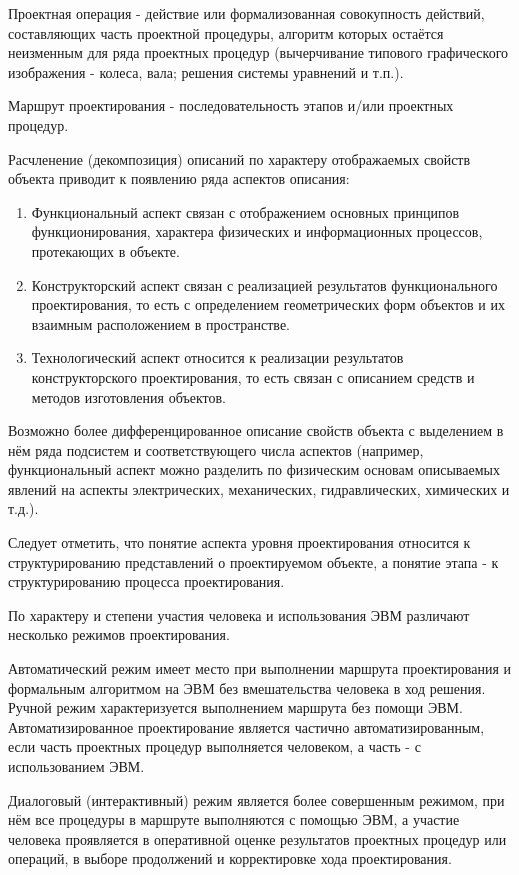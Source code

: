 \documentclass[unicode, 12pt, a4paper, oneside]{article}
\begin{document}
Проектная операция - действие или формализованная совокупность действий, составляющих часть проектной процедуры, алгоритм которых остаётся неизменным для ряда проектных процедур (вычерчивание типового графического изображения - колеса, вала; решения системы уравнений и т.п.). 

Маршрут  проектирования - последовательность этапов и/или проектных процедур. 

Расчленение (декомпозиция) описаний по характеру отображаемых свойств объекта приводит к появлению ряда аспектов описания:

\begin{enumerate}
\item Функциональный аспект связан с отображением основных принципов функционирования, характера физических и информационных процессов, протекающих в объекте. 
\item Конструкторский аспект связан с реализацией результатов функционального проектирования, то есть с определением геометрических форм объектов и их взаимным расположением в пространстве. 
\item Технологический аспект относится к реализации результатов конструкторского проектирования, то есть связан с описанием средств и методов изготовления объектов.
\end{enumerate}
 
Возможно более дифференцированное описание свойств объекта с выделением в нём ряда подсистем и соответствующего числа аспектов (например, функциональный аспект можно разделить по физическим основам описываемых явлений на аспекты электрических, механических, гидравлических, химических и т.д.).

Следует отметить, что понятие аспекта уровня проектирования относится к структурированию представлений о проектируемом объекте, а понятие этапа - к структурированию процесса проектирования. 

По характеру и степени участия человека и использования ЭВМ различают несколько режимов проектирования.

Автоматический режим имеет место при выполнении маршрута проектирования и формальным алгоритмом на ЭВМ без вмешательства человека в ход решения. Ручной режим характеризуется выполнением маршрута без помощи ЭВМ. Автоматизированное проектирование является частично автоматизированным, если часть проектных процедур выполняется человеком, а часть - с использованием ЭВМ. 

Диалоговый (интерактивный) режим является более совершенным режимом, при нём все процедуры в маршруте выполняются с помощью ЭВМ, а участие человека проявляется в оперативной оценке результатов проектных процедур или операций, в выборе  продолжений и корректировке хода проектирования.
\end{document}
